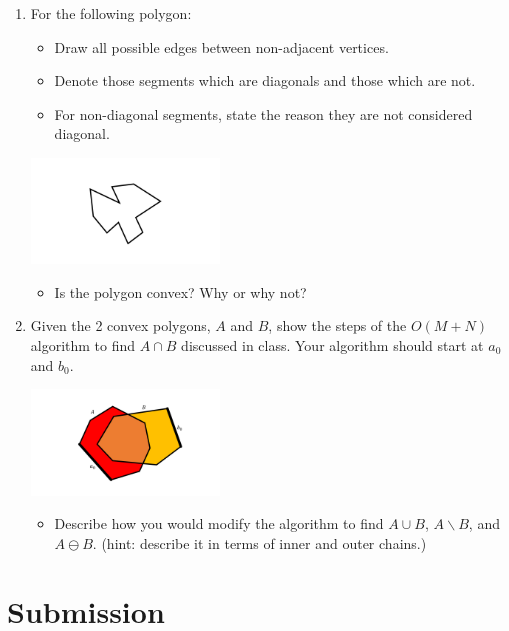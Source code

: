 \documentclass[a4paper,12pt]{article}
\begin{document}
\begin{enumerate}
\item For the following polygon:
\begin{itemize}
\item Draw all possible edges between non-adjacent vertices. 
\item Denote those segments which are diagonals and those which are not. 
\item For non-diagonal segments, state the reason they are not considered diagonal. 
\end{itemize}

\begin{center}
\includegraphics[width=5cm]{../images/worksheet2a.pdf}
\end{center}

\begin{itemize}
\item Is the polygon convex? Why or why not?
\end{itemize}



\item Given the 2 convex polygons, $A$ and $B$, show the steps of the $O(M+N)$ algorithm to find $A \cap B$ discussed in class. Your algorithm should start at $a_0$ and $b_0$. 


\begin{center}
\includegraphics[width=5cm]{../images/worksheet2b.pdf}
\end{center}

\begin{itemize}
\item Describe how you would modify the algorithm to find $A \cup B$, $A \backslash B$, and $A \ominus B$. (hint: describe it in terms of inner and outer chains.)
\end{itemize}


\end{enumerate}


\section{Submission}

\end{document}
